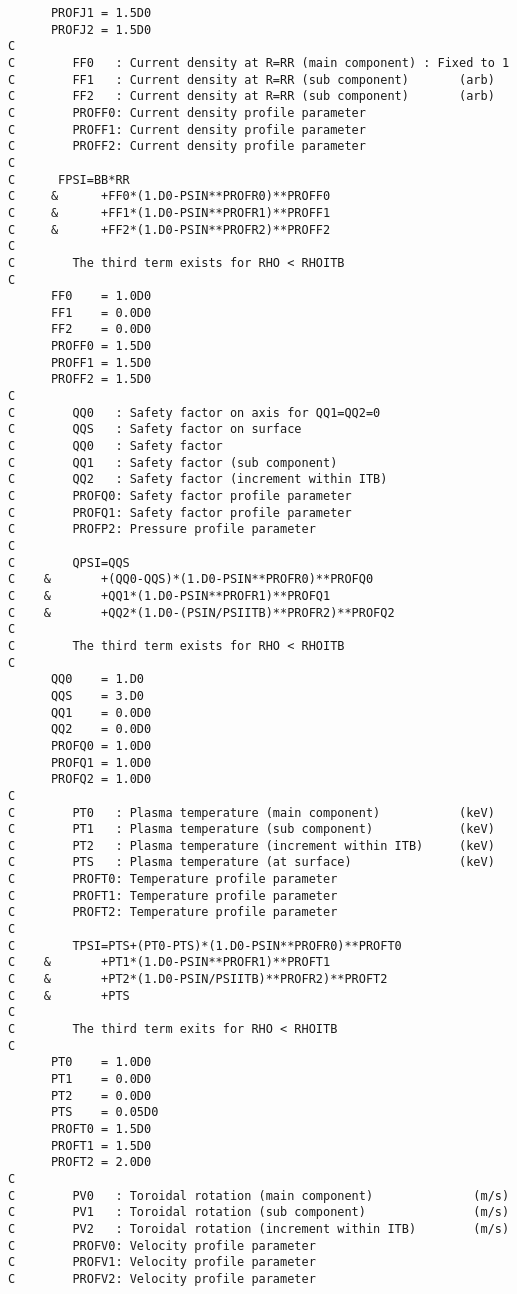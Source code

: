 \documentclass[11pt]{jarticle}
\begin{document}
\begin{verbatim}
      PROFJ1 = 1.5D0
      PROFJ2 = 1.5D0
C
C        FF0   : Current density at R=RR (main component) : Fixed to 1
C        FF1   : Current density at R=RR (sub component)       (arb)
C        FF2   : Current density at R=RR (sub component)       (arb)
C        PROFF0: Current density profile parameter
C        PROFF1: Current density profile parameter
C        PROFF2: Current density profile parameter
C
C      FPSI=BB*RR
C     &      +FF0*(1.D0-PSIN**PROFR0)**PROFF0
C     &      +FF1*(1.D0-PSIN**PROFR1)**PROFF1
C     &      +FF2*(1.D0-PSIN**PROFR2)**PROFF2
C
C        The third term exists for RHO < RHOITB
C
      FF0    = 1.0D0
      FF1    = 0.0D0
      FF2    = 0.0D0
      PROFF0 = 1.5D0
      PROFF1 = 1.5D0
      PROFF2 = 1.5D0
C
C        QQ0   : Safety factor on axis for QQ1=QQ2=0
C        QQS   : Safety factor on surface
C        QQ0   : Safety factor 
C        QQ1   : Safety factor (sub component)
C        QQ2   : Safety factor (increment within ITB)
C        PROFQ0: Safety factor profile parameter
C        PROFQ1: Safety factor profile parameter
C        PROFP2: Pressure profile parameter
C
C        QPSI=QQS
C    &       +(QQ0-QQS)*(1.D0-PSIN**PROFR0)**PROFQ0
C    &       +QQ1*(1.D0-PSIN**PROFR1)**PROFQ1
C    &       +QQ2*(1.D0-(PSIN/PSIITB)**PROFR2)**PROFQ2
C
C        The third term exists for RHO < RHOITB
C
      QQ0    = 1.D0
      QQS    = 3.D0
      QQ1    = 0.0D0
      QQ2    = 0.0D0
      PROFQ0 = 1.0D0
      PROFQ1 = 1.0D0
      PROFQ2 = 1.0D0
C
C        PT0   : Plasma temperature (main component)           (keV)
C        PT1   : Plasma temperature (sub component)            (keV)
C        PT2   : Plasma temperature (increment within ITB)     (keV)
C        PTS   : Plasma temperature (at surface)               (keV)
C        PROFT0: Temperature profile parameter
C        PROFT1: Temperature profile parameter
C        PROFT2: Temperature profile parameter
C
C        TPSI=PTS+(PT0-PTS)*(1.D0-PSIN**PROFR0)**PROFT0
C    &       +PT1*(1.D0-PSIN**PROFR1)**PROFT1
C    &       +PT2*(1.D0-PSIN/PSIITB)**PROFR2)**PROFT2
C    &       +PTS
C
C        The third term exits for RHO < RHOITB
C
      PT0    = 1.0D0
      PT1    = 0.0D0
      PT2    = 0.0D0
      PTS    = 0.05D0
      PROFT0 = 1.5D0
      PROFT1 = 1.5D0
      PROFT2 = 2.0D0
C
C        PV0   : Toroidal rotation (main component)              (m/s)
C        PV1   : Toroidal rotation (sub component)               (m/s)
C        PV2   : Toroidal rotation (increment within ITB)        (m/s)
C        PROFV0: Velocity profile parameter
C        PROFV1: Velocity profile parameter
C        PROFV2: Velocity profile parameter

\end{verbatim}
\end{document}
